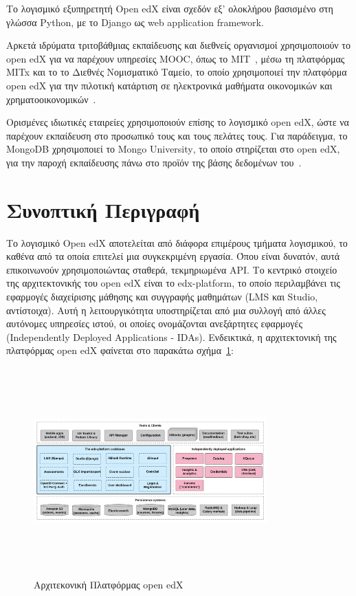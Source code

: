 \documentclass[12pt]{report}
\begin{document}
Το λογισμικό εξυπηρετητή \textlatin{Open edX} είναι σχεδόν εξ' ολοκλήρου βασισμένο στη γλώσσα \textlatin{Python}, με το \textlatin{Django} ως \textlatin{web application framework}.

Αρκετά ιδρύματα τριτοβάθμιας εκπαίδευσης και διεθνείς οργανισμοί χρησιμοποιούν το \textlatin{open edX} για να παρέχουν υπηρεσίες \textlatin{MOOC}, όπως το \textlatin{MIT}~\cite{mit_open_learning_2018}, μέσω τη πλατφόρμας \textlatin{MITx} και το το Διεθνές Νομισματικό Ταμείο, το οποίο χρησιμοποιεί την πλατφόρμα \textlatin{open edX} για την πιλοτική κατάρτιση σε ηλεκτρονικά μαθήματα οικονομικών και χρηματοοικονομικών~\cite{edx_2014}.

Ορισμένες ιδιωτικές εταιρείες χρησιμοποιούν επίσης το λογισμικό \textlatin{open edX}, ώστε να παρέχουν εκπαίδευση στο προσωπικό τους και τους πελάτες τους. Για παράδειγμα, το \textlatin{MongoDB} χρησιμοποιεί το \textlatin{Mongo University}, το οποίο στηρίζεται στο \textlatin{open edX}, για την παροχή εκπαίδευσης πάνω στο προϊόν της βάσης δεδομένων του~\cite{mongodb}.

\section{Συνοπτική Περιγραφή}
Το λογισμικό \textlatin{Open edX} αποτελείται από διάφορα επιμέρους τμήματα λογισμικού, το καθένα από τα οποία επιτελεί μια συγκεκριμένη εργασία. Όπου είναι δυνατόν, αυτά επικοινωνούν χρησιμοποιώντας σταθερά, τεκμηριωμένα \textlatin{API}. Το κεντρικό στοιχείο της αρχιτεκτονικής του \textlatin{open edX} είναι το \textlatin{edx-platform}, το οποίο περιλαμβάνει τις εφαρμογές διαχείρισης μάθησης και συγγραφής μαθημάτων (\textlatin{LMS} και \textlatin{Studio}, αντίστοιχα). Αυτή η λειτουργικότητα υποστηρίζεται από μια συλλογή από άλλες αυτόνομες υπηρεσίες ιστού, οι οποίες ονομάζονται ανεξάρτητες εφαρμογές (\textlatin{Independently Deployed Applications - IDAs}). Ενδεικτικά, η αρχιτεκτονική της πλατφόρμας \textlatin{open edX} φαίνεται στο παρακάτω σχήμα~\ref{fig:edx_arch}:
\begin{figure}[h]
\centering
\includegraphics[width=0.8\textwidth, height=8cm]{edx-architecture}
\caption{Αρχιτεκονική Πλατφόρμας \textlatin{open edX}}
\label{fig:edx_arch}
\end{figure}
\end{document}
